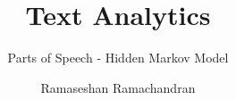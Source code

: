 


\title[ADPG]{\Huge Text Analytics}
\subtitle{ \LARGE{Parts of Speech - Hidden Markov Model}}
\author[RR]{Ramaseshan Ramachandran}
\date{}



    \makeatother
    \begin{frame}
        \titlepage
    \end{frame}

    \setcounter{framenumber}{0}


    \begin{frame}
        \begin{multicols}{2}
            \hypersetup{linkcolor=white}
            \tableofcontents
        \end{multicols}
    \end{frame}


    




